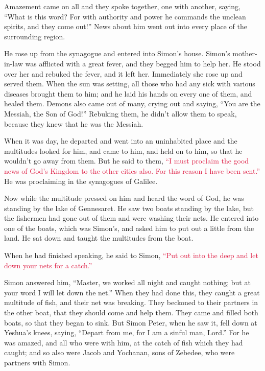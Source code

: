 \myverse{}Amazement came on all and they spoke together, one with another,
saying, “What is this word? For with authority and power he commands the unclean spirits, and they come
out!”
\myverse{}News about him went out into every place of the surrounding region.

\myverse{}He rose up from the synagogue and entered into Simon’s house.
Simon’s mother-in-law was afflicted with a great fever, and they begged him to help her.
\myverse{}He stood over her and rebuked the fever, and it left her. Immediately she
rose up and served them.
\myverse{}When the sun was setting, all those who had any sick with various diseases
brought them to him; and he laid his hands on every one of them, and healed them.
\myverse{}Demons also came out of many, crying out and saying, “You are the Messiah,
the Son of God!” Rebuking them, he didn’t allow them to speak, because they knew that he was the Messiah.

\myverse{}When it was day, he departed and went into an uninhabited place
and the multitudes looked for him, and came to him, and held on to him, so that he wouldn’t go away from
them.
\myverse{}But he said to them,
\textcolor{crimson}{“I must proclaim the good news of God’s Kingdom to the other cities also. For this reason I have been
	sent.”}
\myverse{}He was proclaiming in the synagogues of Galilee.


\mychapter{} \myverse*{}Now while the multitude pressed on him and heard the word of God,
he was standing by the lake of Gennesaret.
\myverse{}He saw two boats standing by the lake, but the fishermen had gone out of them
and were washing their nets.
\myverse{}He entered into one of the boats, which was Simon’s, and asked him to put out
a little from the land. He sat down and taught the multitudes from the boat.

\myverse{}When he had finished speaking, he said to Simon,
\textcolor{crimson}{“Put out into the deep and let down your nets for a catch.”}

\myverse{}Simon answered him, “Master, we worked all night and caught nothing;
but at your word I will let down the net.”
\myverse{}When they had done this, they caught a great multitude of fish, and their net
was breaking.
\myverse{}They beckoned to their partners in the other boat, that they should come and
help them. They came and filled both boats, so that they began to sink.
\myverse{}But Simon Peter, when he saw it, fell down at Yeshua’s knees, saying, “Depart
from me, for I am a sinful man, Lord.”
\myverse{}For he was amazed, and all who were with him, at the catch of fish which they
had caught;
\myverse{}and so also were Jacob and Yochanan, sons of Zebedee, who were partners with
Simon.

